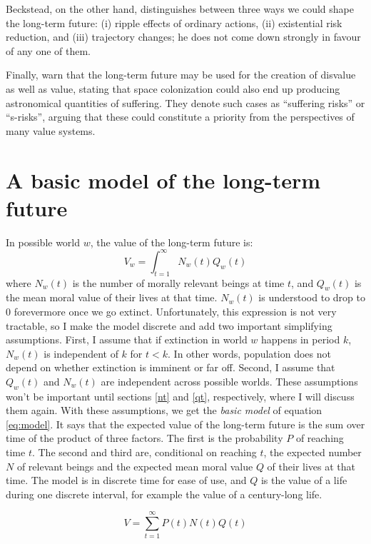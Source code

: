 \documentclass[british]{article}
\begin{document}
Beckstead, on the other hand, distinguishes between three ways we could shape the long-term future: (i)
ripple effects of ordinary actions, (ii) existential risk reduction, and
(iii) trajectory changes; he does not come down strongly in favour of any one of them.

Finally, \cite{althaus_reducing_2016} warn that the long-term future may be used for the creation of disvalue as well as value, stating that space colonization could also end up producing astronomical quantities of suffering. They denote such cases as ``suffering risks'' or ``s-risks'', arguing that these could constitute a priority from the perspectives of many value systems.

\section{A basic model of the long-term future}\label{sec:basicmodel}
In possible world $w$, the value of the long-term future is:
$$V_w = \int_{t=1}^\infty N_w(t)Q_w(t)$$
where $N_w(t)$ is the number of morally relevant beings at time $t$, and $Q_w(t)$ is the mean moral value of their lives at that time. $N_w(t)$ is understood to drop to 0 forevermore once we go extinct. Unfortunately, this expression is not very tractable, so I make the model discrete and add two important simplifying assumptions. First, I assume that if extinction in world $w$ happens in period $k$, $N_w(t)$ is independent of $k$ for $t<k$. In other words, population does not depend on whether extinction is imminent or far off. Second, I assume that $Q_w(t)$ and $N_w(t)$ are independent across possible worlds. These assumptions won't be important until sections \ref{nt} and \ref{qt}, respectively, where I will discuss them again. With these assumptions, we get the \emph{basic model} of equation \ref{eq:model}. It says that the expected value of the long-term future is the sum over time of the product of three factors. The first is the probability $P$ of reaching time \(t\). The second and third are, conditional on reaching $t$, the expected number $N$ of relevant beings and the expected mean moral value $Q$ of their lives at that time. The model is in discrete time for ease of use, and $Q$ is the value of a life during one discrete interval, for example the value of a century-long life.

\begin{equation}
V=\sum_{t=1}^\infty P(t) N(t)Q(t) \label{eq:model}
\end{equation}
\end{document}
